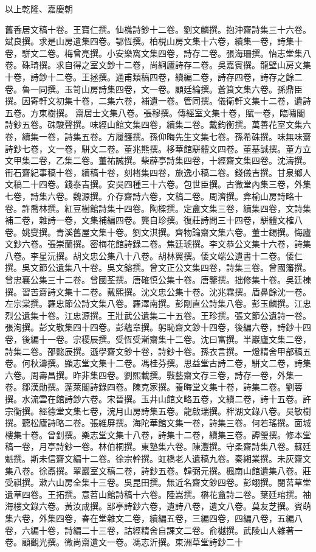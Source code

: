 \begin{pinyinscope}
以上乾隆、嘉慶朝

舊香居文稿十卷。王寶仁撰。仙樵詩鈔十二卷。劉文麟撰。抱沖齋詩集三十六卷。斌良撰。求是山房遺集四卷。鄂恆撰。柏梘山房文集十六卷，續集一卷，詩集十卷，駢文二卷。梅曾亮撰。小安樂窩文集四卷，詩存二卷。張海珊撰。怡志堂集八卷。硃琦撰。求自得之室文鈔十二卷，尚絅廬詩存二卷。吳嘉賓撰。龍壁山房文集十卷，詩鈔十二卷。王拯撰。通甫類稿四卷，續編二卷，詩存四卷，詩存之餘二卷。魯一同撰。玉笥山房詩集四卷，文一卷。顧廷綸撰。蒼筤文集六卷。孫鼎臣撰。因寄軒文初集十卷，二集六卷，補遺一卷。管同撰。儀衛軒文集十二卷，遺詩五卷。方東樹撰。齋居士文集八卷。張穆撰。傳經室文集十卷，賦一卷，臨嘯閣詩鈔五卷。硃駿聲撰。味經山館文集四卷，續集二卷。戴鈞衡撰。萬善花室文集六卷，續集一卷，詩集五卷。方履籛撰。孫仰晦先生文集七卷。孫希硃撰。味無味齋詩鈔七卷，文一卷，駢文二卷。董兆熊撰。栘華館駢體文四卷。董基誠撰。董方立文甲集二卷，乙集二卷。董祐誠撰。柴薜亭詩集四卷，十經齋文集四卷。沈濤撰。衎石齋紀事稿十卷，續稿十卷，刻楮集四卷，旅逸小稿二卷。錢儀吉撰。甘泉鄉人文稿二十四卷。錢泰吉撰。安吳四種三十六卷。包世臣撰。古微堂內集三卷，外集七卷，詩集六卷。魏源撰。介存齋詩六卷，文稿二卷。周濟撰。弇榆山房詩略十卷。許喬林撰。紅豆樹館詩集十四卷。陶樑撰。定盦文集三卷，續集四卷，文詩集補二卷，雜詩一卷，文集補編四卷。龔自珍撰。復莊詩問三十四卷，駢體文榷八卷。姚燮撰。青溪舊屋文集十卷。劉文淇撰。齊物論齋文集六卷。董士錫撰。悔廬文鈔六卷。張崇蘭撰。密梅花館詩錄二卷。焦廷琥撰。李文恭公文集十六卷，詩集八卷。李星沅撰。胡文忠公集八十八卷。胡林翼撰。倭文端公遺書十二卷。倭仁撰。吳文節公遺集八十卷。吳文鎔撰。曾文正公文集四卷，詩集三卷。曾國籓撰。曾忠襄公集三十二卷。曾國荃撰。唐確慎公集十卷。唐鑒撰。拙修集十卷。吳廷棟撰。習苦齋詩文集十二卷。戴熙撰。沈文忠公集十卷。沈兆霖撰。盾鼻餘沈一卷。左宗棠撰。羅忠節公詩文集八卷。羅澤南撰。彭剛直公詩集八卷。彭玉麟撰。江忠烈公遺集十卷。江忠源撰。王壯武公遺集二十五卷。王珍撰。張文節公遺詩一卷。張洵撰。彭文敬集四十四卷。彭蘊章撰。躬恥齋文鈔十四卷，後編六卷，詩鈔十四卷，後編十一卷。宗稷辰撰。受恆受漸齋集十二卷。沈曰富撰。半巖廬文集二卷，詩集二卷。邵懿辰撰。遜學齋文鈔十卷，詩鈔十卷。孫衣言撰。一燈精舍甲部稿五卷。何秋濤撰。顯志堂文集十二卷。馮桂芬撰。思益堂古詩二卷，駢文二卷，詩集六卷。周壽昌撰。昨非集四卷。劉熙載撰。斅藝齋文存三卷，詩存一卷，外集一卷。鄒漢勛撰。蓬萊閣詩錄四卷。陳克家撰。養晦堂文集十卷，詩集二卷。劉蓉撰。水流雲在館詩鈔六卷。宋晉撰。玉井山館文略五卷，文續二卷，詩十五卷。許宗衡撰。經德堂文集七卷，浣月山房詩集五卷。龍啟瑞撰。柈湖文錄八卷。吳敏樹撰。聽松廬詩略二卷。張維屏撰。海陀華館文集一卷，詩集三卷。何若瑤撰。面城樓集十卷。曾釗撰。樂志堂文集十八卷，詩集十二卷，續集三卷。譚瑩撰。修本堂稿一卷，月亭詩鈔一卷。林伯桐撰。東塾集六卷。陳灃撰。守柔齋詩集八卷。蘇廷魁撰。斯未信齋文編十二卷。徐宗幹撰。虹橋老人遺稿九卷。秦緗業撰。未灰齋文集八卷。徐鼒撰。翠巖室文稿二卷，詩鈔五卷。韓弼元撰。楓南山館遺集八卷。莊受祺撰。漱六山房全集十三卷。吳昆田撰。無近名齋文鈔四卷。彭翊撰。閱莒草堂遺草四卷。王拓撰。意苕山館詩稿十六卷。陸嵩撰。楙花盦詩二卷。葉廷琯撰。袖海樓文錄六卷。黃汝成撰。郘亭詩鈔六卷，遺詩八卷，遺文八卷。莫友芝撰。賓萌集六卷，外集四卷，春在堂雜文二卷，續編五卷，三編四卷，四編八卷，五編八卷，六編十卷，詩編二十三卷，詁經精舍自課文二卷。俞樾撰。武陵山人雜著一卷。顧觀光撰。微尚齋遺文一卷。馮志沂撰。東洲草堂詩鈔二十
\end{pinyinscope}
